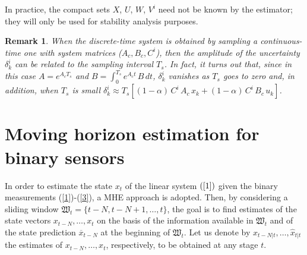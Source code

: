 \documentclass[11pt,journal,onecolumn]{IEEEtran}
\newtheorem{remark}{Remark}
\begin{document}
In practice, the compact sets $X$, $U$, $W$, $V^i$ need not be known by the estimator; they will only be used for stability analysis purposes.
\begin{remark}
When the discrete-time system is obtained by sampling a continuous-time one with system matrices ($A_{c},B_{c},C^i$), then the amplitude of the uncertainty $ \delta^i_{k}$ can be related to the sampling interval $T_{s}$. In fact, it turns out that, since in this case $A = e^{A_c T_s}$ and $B=\int_{0}^{T_s} e^{A_c t} \, B \, dt$, $\delta^i_{k}$ vanishes as $T_s$ goes to zero and, in addition, when $T_s$ is small
$ \delta^i_{k}  \approx T_s \left [ (1-\alpha) \, C^{i} \, A_c \, x_{k}+(1-\alpha) \, C^{i} \, B_c \, u_{k} \right ]$.
\end{remark}

\section{Moving horizon estimation for binary sensors}

In order to estimate the state $x_t$ of the linear system $(\ref{1})$ given the binary measurements (\ref{1})-(\ref{3}), a MHE approach is adopted. Then, by considering a sliding window $\mathfrak W_t = \{t-N, t-N+1, \ldots, t\}$, the goal is to find estimates of the state vectors $x_{t-N},\ldots,x_{t}$ on the basis of the information available in  $\mathfrak W_t$ and of the state prediction $\overline{x}_{t-N}$ at the beginning of $\mathfrak W_t$.  Let us denote by $\hat{x}_{t-N|t},\ldots,\hat{x}_{t|t}$ the estimates of $x_{t-N},\ldots,x_{t}$, respectively, to be obtained at any stage $t$.
\end{document}
